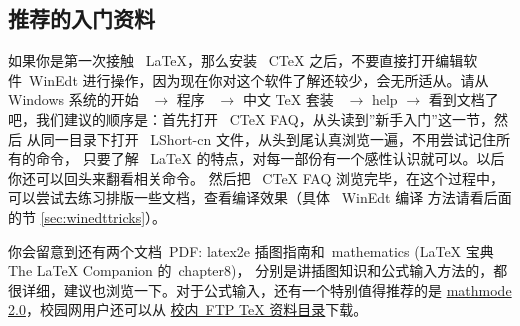 \subsection{推荐的入门资料}

如果你是第一次接触~ LaTeX，那么安装~ CTeX 之后，不要直接打开编辑软件~WinEdt 进行操作，因为现在你对这个软件了解还较少，会无所适从。请从~ Windows
系统的开始~ $\rightarrow$ 程序~ $\rightarrow$ 中文 TeX 套装~ $\rightarrow$ help $\rightarrow$
看到文档了吧，我们建议的顺序是：首先打开~ CTeX FAQ，从头读到''新手入门''这一节，然后
从同一目录下打开~ LShort-cn 文件，从头到尾认真浏览一遍，不用尝试记住所有的命令，
只要了解~ LaTeX 的特点，对每一部份有一个感性认识就可以。以后你还可以回头来翻看相关命令。
然后把 ~CTeX FAQ 浏览完毕，在这个过程中，可以尝试去练习排版一些文档，查看编译效果（具体~ WinEdt 编译
方法请看后面的节 \ref{sec:winedttricks}）。

你会留意到还有两个文档~PDF: latex2e 插图指南和~mathematics (LaTeX 宝典 The LaTeX Companion 的~chapter8)，
分别是讲插图知识和公式输入方法的，都很详细，建议也浏览一下。对于公式输入，还有一个特别值得推荐的是
\href{http://www.tug.org/tex-archive/info/math/voss/mathmode/}{mathmode 2.0}，校园网用户还可以从
\href{ftp://202.118.224.241/software/Science/TeX&LaTeX/TeX documents/}{校内~FTP TeX 资料目录}下载。
\begin{figure}[htbp]
\centering
{}
\label{Figure:Tricks:Example2}
\end{figure}

\begin{figure}[htbp]
\centering
\begin{minipage}{0.25\textwidth}
\centering
{}
\end{minipage}
\begin{minipage}{0.25\textwidth}
\centering
{}
\end{minipage}
\begin{minipage}{0.25\textwidth}
\centering
{}
\end{minipage}
\label{Figure:Tricks:Example3}
\end{figure}


